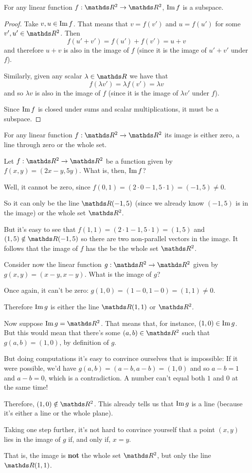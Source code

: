 \begin{prop}
	For any linear function $f:\R^2\to\R^2$, $\operatorname{Im} f$ is a subspace.
\end{prop}
\begin{proof}
	Take $v,u\in \operatorname{Im} f$. That means that $v=f(v')$ and $u=f(u')$ for some $v',u'\in\R^2$. Then
	\[f(u'+v')=f(u')+f(v')=u+v\]and therefore $u+v$ is also in the image of $f$ (since it is the image of $u'+v'$ under $f$).
	
	Similarly, given any scalar $\lambda\in \R$ we have that
	\[f(\lambda v')=\lambda f(v')=\lambda v\]and so $\lambda v$ is also in the image of $f$ (since it is the image of $\lambda v'$ under $f$).
	
	Since $\operatorname{Im} f$ is closed under sums and scalar multiplications, it must be a subspace.
\end{proof}
\begin{cor}
	For any linear function $f:\R^2\to\R^2$ its image is either zero, a line through zero or the whole set.
\end{cor}

\begin{ex}
	Let $f:\R^2\to\R^2$ be a function given by $f(x,y)=(2x-y,5y)$. What is, then, $\operatorname{Im} f$?
	
	Well, it cannot be zero, since $f(0,1)=(2\cdot0-1,5\cdot 1)=(-1,5)\neq 0$.
	
	So it can only be the line $\R (-1,5)$ (since we already know $(-1,5)$ is in the image) or the whole set $\R^2$.
	
	But it's easy to see that $f(1,1)=(2\cdot 1-1,5\cdot 1)=(1,5)$ and $(1,5)\notin\R(-1,5)$ so there are two non-parallel vectors in the image. It follows that the image of $f$ has the be the whole set $\R^2$.
	
	\bigskip
	Consider now the linear function $g:\R^2\to\R^2$ given by $g(x,y)=(x-y,x-y)$. What is the image of $g$?
	
	Once again, it can't be zero: $g(1,0)=(1-0,1-0)=(1,1)\neq 0$.
	
	Therefore $\operatorname{Im} g$ is either the line $\R (1,1)$ or $\R^2$.
	
	Now suppose $\im g =\R^2$. That means that, for instance, $(1,0)\in \operatorname{Im} g$. But this would mean that there's some $(a,b)\in \R^2$ such that $g(a,b)=(1,0)$, by definition of $g$.
	
	But doing computations it's easy to convince ourselves that is impossible: If it were possible, we'd have $g(a,b)=(a-b,a-b)=(1,0)$ and so $a-b=1$ and $a-b=0$, which is a contradiction. A number can't equal both $1$ and $0$ at the same time!
	
	Therefore, $(1,0)\notin \R^2$. This already tells us that $\operatorname{Im} g$ is a line (because it's either a line or the whole plane).
	
	Taking one step further, it's not hard to convince yourself that a point $(x,y)$ lies in the image of $g$ if, and only if, $x=y$.
	
	That is, the image is \textbf{not} the whole set $\R^2$, but only the line $\R(1,1)$.
\end{ex}

